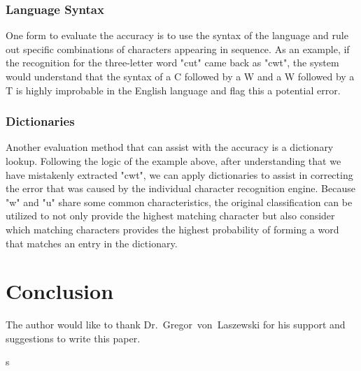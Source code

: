 \subsubsection{Language Syntax}
One form to evaluate the accuracy is to use the syntax of the language and rule out specific combinations of characters appearing in sequence. As an example, if the recognition for the three-letter word "cut" came back as "cwt", the system would understand that the syntax of a C followed by a W and a W followed by a T is highly improbable in the English language and flag this a potential error\cite{hid-sp18-414-www-eikvilocr}. 

\subsubsection{Dictionaries}
Another evaluation method that can assist with the accuracy is a dictionary lookup. Following the logic of the example above, after understanding that we have mistakenly extracted "cwt", we can apply dictionaries to assist in correcting the error that was caused by the individual character recognition engine. Because "w" and "u" share some common characteristics, the original classification can be utilized to not only provide the highest matching character but also consider which matching characters provides the highest probability of forming a word that matches an entry in the dictionary\cite{hid-sp18-414-www-eikvilocr}. 

\section{Conclusion}




\begin{acks}

The author would like to thank Dr.~Gregor~von~Laszewski for his
support and suggestions to write this paper.

\end{acks}


 

s